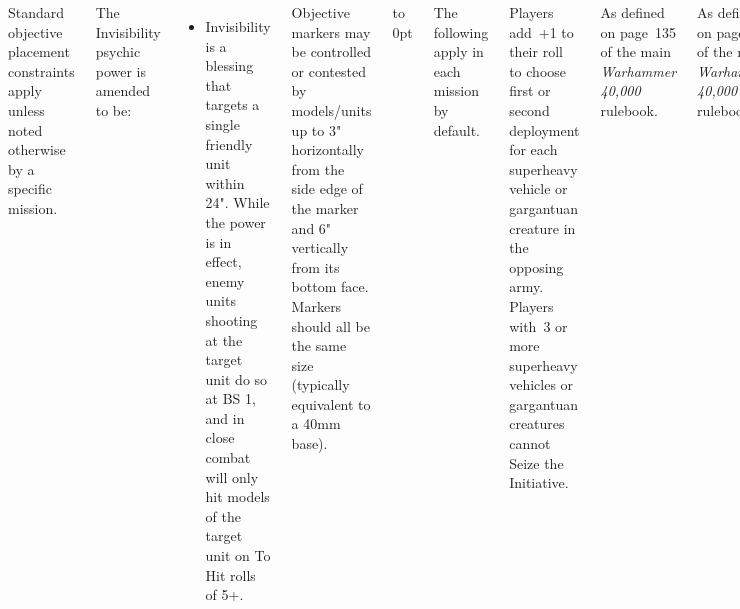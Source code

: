 \begin{columns}
Standard objective placement constraints apply
unless noted otherwise by a specific mission.


The Invisibility psychic power is amended to be:

\begin{itemize}\shortlist
\item Invisibility is a blessing that targets a single friendly unit
  within 24". While the power is in effect, enemy units shooting at
  the target unit do so at BS 1, and in close combat will only hit
  models of the target unit on To Hit rolls of 5+.
\end{itemize}


Objective markers may be controlled or contested by models/units up to
3" horizontally from the side edge of the marker and 6" vertically
from its bottom face. Markers should all be the same size (typically
equivalent to a 40mm base).

\vfill\vbox to 0pt{}
\columnbreak
{}

The following apply in each mission by default.

\vspace*{-10pt}%
\nightfighting

\vspace*{-10pt}%
  Players add~+1 to their roll to
choose first or second deployment for each superheavy vehicle or
gargantuan creature in the opposing army. Players with~3 or more
superheavy vehicles or gargantuan creatures cannot Seize the
Initiative.

\vspace*{-10pt}%
 As defined on page~135 of the main
\emph{Warhammer 40,000} rulebook.

\vspace*{-10pt}%
 As defined on page~132 of
the main \emph{Warhammer 40,000} rulebook.

\vspace*{-10pt}%
 As defined on page~133 of
the main \emph{Warhammer 40,000} rulebook.

\vspace*{-10pt}%
  Units/models in reserve at game end count
as completely destroyed/removed as a casualty.



\end{columns}

